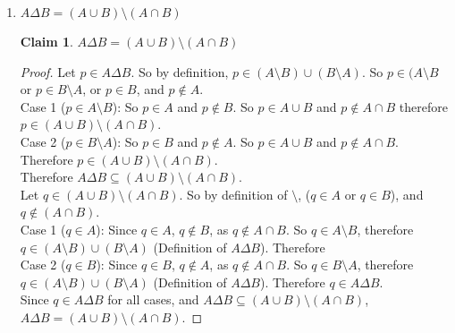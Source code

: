 \documentclass[11pt]{letter}
\newtheorem{claim}{Claim}
\theoremstyle{definition}
\begin{document}
\begin{description}
\begin{enumerate}
\begin{enumerate}
\begin{proof}
Since $B\Delta A \subseteq B\Delta A$, and $A\Delta B\subseteq B\Delta A$, it can be concluded that $A\Delta B=B\Delta A$.
\end{proof}
					\item $A\Delta B=(A\cup B)\setminus(A\cap B)$
\begin{claim}
$A\Delta B=(A\cup B)\setminus(A\cap B)$
\end{claim}
\begin{proof}
  Let $p\in A\Delta B$. So by definition, $p\in (A\setminus B)\cup (B\setminus A)$. So $p\in (A\setminus B$ or  $p\in B\setminus A$, or $p\in B$, and $p\notin A$.\\
  Case 1 ($p\in A\setminus B$): So $p\in A$ and $p\notin B$. So $p\in A\cup B$ and $p\notin A\cap B$ therefore $p\in (A\cup B)\setminus (A\cap B)$.\\
  Case 2 ($p\in B\setminus A$): So $p\in B$ and $p\notin A$. So $p\in A\cup B$ and $p\notin A\cap B$. Therefore $p\in (A\cup B)\setminus (A\cap B)$.\\
  Therefore $A\Delta B\subseteq (A\cup B)\setminus(A\cap B)$.\\

  Let $q\in (A\cup B)\setminus (A\cap B)$. So by definition of $\setminus$, ($q\in A$ or $q\in B$), and $q\notin (A\cap B)$.\\
  Case 1 ($q\in A$): Since $q\in A$, $q\notin B$, as $q\notin A\cap B$. So $q\in A\setminus B$, therefore $q\in (A\setminus B)\cup (B\setminus A)$ (Definition of $A\Delta B$). Therefore \\
  Case 2 ($q\in B$): Since $q\in B$, $q\notin A$, as $q\notin A\cap B$. So $q\in B\setminus A$, therefore $q\in (A\setminus B)\cup (B\setminus A)$ (Definition of $A\Delta B$). Therefore $q\in A\Delta B$. \\
  Since $q\in A\Delta B$ for all cases, and $A\Delta B\subseteq (A\cup B)\setminus(A\cap B)$, $A\Delta B=(A\cup B)\setminus(A\cap B)$.


\end{proof}
\end{enumerate}
\end{enumerate}
\end{description}
\end{document}
